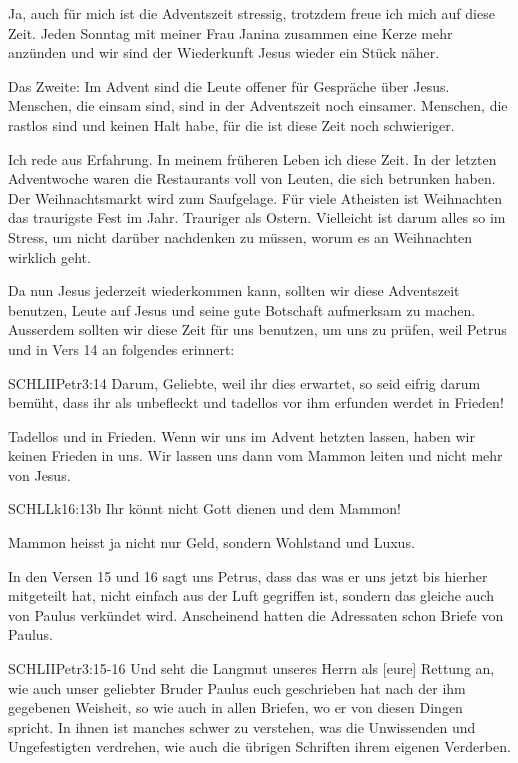 \documentclass[fontsize=16pt]{mybib}
\begin{document}
Ja, auch für mich ist die Adventszeit stressig, trotzdem freue ich mich auf diese Zeit. Jeden Sonntag mit meiner Frau Janina zusammen eine Kerze mehr anzünden und wir sind der Wiederkunft Jesus wieder ein Stück näher.

Das Zweite: Im Advent sind die Leute offener für Gespräche über Jesus. Menschen, die einsam sind, sind in der Adventszeit noch einsamer. Menschen, die rastlos sind und keinen Halt habe, für die ist diese Zeit noch schwieriger.

Ich rede aus Erfahrung. In meinem früheren Leben  ich diese Zeit. In der letzten Adventwoche waren die Restaurants voll von Leuten, die sich betrunken haben. Der Weihnachtsmarkt wird zum Saufgelage. Für viele Atheisten ist Weihnachten das traurigste Fest im Jahr. Trauriger als Ostern. Vielleicht ist darum alles so im Stress, um nicht darüber nachdenken zu müssen, worum es an Weihnachten wirklich geht.

Da nun Jesus jederzeit wiederkommen kann, sollten wir diese Adventszeit benutzen, Leute auf Jesus und seine gute Botschaft aufmerksam zu machen. Ausserdem sollten wir diese Zeit für uns benutzen, um uns zu prüfen, weil Petrus und in Vers 14 an folgendes erinnert:
\begin{bibelbox}{SCHL}{IIPetr}{3:14}
Darum, Geliebte, weil ihr dies erwartet, so seid eifrig darum bemüht, dass ihr als unbefleckt und tadellos vor ihm erfunden werdet in Frieden!
\end{bibelbox}
Tadellos und in Frieden. Wenn wir uns im Advent hetzten lassen, haben wir keinen Frieden in uns. Wir lassen uns dann vom Mammon leiten und nicht mehr von Jesus.
\begin{bibelbox}{SCHL}{Lk}{16:13b}
  Ihr könnt nicht Gott dienen und dem Mammon!
\end{bibelbox}
Mammon heisst ja nicht nur Geld, sondern Wohlstand und Luxus. 

In den Versen 15 und 16 sagt uns Petrus, dass das was er uns jetzt bis hierher mitgeteilt hat, nicht einfach aus der Luft gegriffen ist, sondern das gleiche auch von Paulus verkündet wird. Anscheinend hatten die Adressaten schon Briefe von Paulus.
\begin{bibelbox}{SCHL}{IIPetr}{3:15-16}
Und seht die Langmut unseres Herrn als [eure] Rettung an, wie auch unser geliebter Bruder Paulus euch geschrieben hat nach der ihm gegebenen Weisheit, so wie auch in allen Briefen, wo er von diesen Dingen spricht. In ihnen ist manches schwer zu verstehen, was die Unwissenden und Ungefestigten verdrehen, wie auch die übrigen Schriften ihrem eigenen Verderben.
\end{bibelbox}
\end{document}
